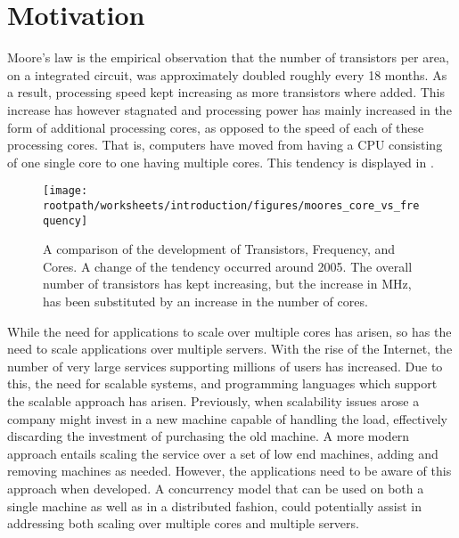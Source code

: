 \makeatletter {}\makeatother
{}
\section{Motivation}
Moore's law\cite{moore1965cramming} is the empirical observation that the number of transistors per area, on a integrated circuit, was approximately doubled roughly every 18 months\cite[p. 203]{mack2011fifty}. As a result, processing speed kept increasing as more transistors where added. This increase has however stagnated and processing power has mainly increased in the form of additional processing cores, as opposed to the speed of each of these processing cores\cite[p. 22]{sevenModels}. That is, computers have moved from having a \ac{CPU} consisting of one single core to one having multiple cores. This tendency is displayed in . 
\label{chap:introduction}

\begin{figure}[htbp]
\centering
 \texttt{[image: \\rootpath/worksheets/introduction/figures/moores\_core\_vs\_frequency]} 
 \caption{A comparison of the development of Transistors, Frequency, and Cores\cite{isca2009}. A change of the tendency occurred around 2005. The overall number of transistors has kept increasing, but the increase in MHz, has been substituted by an increase in the number of cores.}
\label{fig:moores_in_reality}
\end{figure}

While the need for applications to scale over multiple cores has arisen, so has the need to scale applications over multiple servers. With the rise of the Internet, the number of very large services supporting millions of users has increased. Due to this, the need for scalable systems, and programming languages which support the scalable approach has arisen. Previously, when scalability issues arose a company might invest in a new machine capable of handling the load, effectively discarding the investment of purchasing the old machine\cite[p. 2]{haller2007actors}. A more modern approach entails scaling the service over a set of low end machines, adding and removing machines as needed. However, the applications need to be aware of this approach when developed. A concurrency model that can be used on both a single machine as well as in a distributed fashion, could potentially assist in addressing both scaling over multiple cores and multiple servers.

